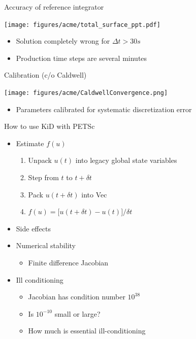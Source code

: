 \documentclass{beamer}
\begin{document}
\begin{frame}{Accuracy of reference integrator}
  \begin{center}
    \texttt{[image: figures/acme/total\_surface\_ppt.pdf]}
  \end{center}
  \begin{itemize}
  \item Solution completely wrong for $\Delta t > 30s$
  \item Production time steps are several minutes
  \end{itemize}
\end{frame}

\begin{frame}{Calibration (c/o Caldwell)}
  \begin{center}
    \texttt{[image: figures/acme/CaldwellConvergence.png]}
  \end{center}
  \begin{itemize}
  \item Parameters calibrated for systematic discretization error
  \end{itemize}
\end{frame}



\begin{frame}{How to use KiD with PETSc}
  \begin{itemize}
  \item Estimate $f(u)$
    \begin{enumerate}
    \item Unpack $u(t)$ into legacy global state variables
    \item Step from $t$ to $t+\delta t$
    \item Pack $u(t+\delta t)$ into Vec
    \item $f(u) = \Big[u(t+\delta t) - u(t) \Big]/\delta t$
    \end{enumerate}
  \item Side effects
  \item Numerical stability
    \begin{itemize}
    \item Finite difference Jacobian
    \end{itemize}
  \item Ill conditioning
    \begin{itemize}
    \item Jacobian has condition number $10^{38}$
    \item Is $10^{-10}$ small or large?
    \item How much is essential ill-conditioning
    \end{itemize}
  \end{itemize}
\end{frame}
\end{document}
